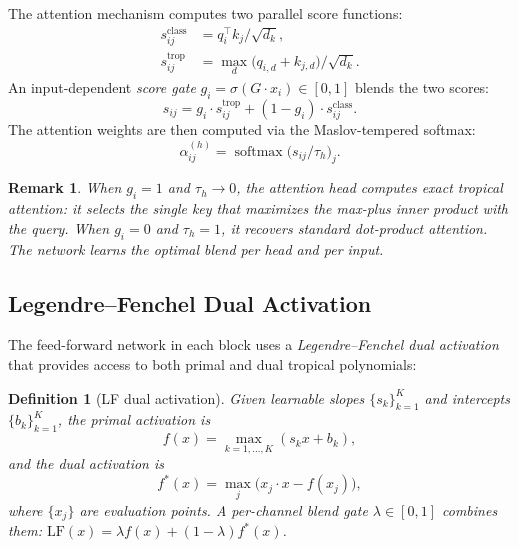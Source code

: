 \documentclass[11pt,twocolumn]{article}
\newtheorem{definition}[theorem]{Definition}
\newtheorem{remark}[theorem]{Remark}
\newcommand{\softmax}{\operatorname{softmax}}
\begin{document}
The attention mechanism computes two parallel score functions:
\begin{align}
  s^\text{class}_{ij} &= q_i^\top k_j / \sqrt{d_k}, \label{eq:class-score} \\
  s^\text{trop}_{ij} &= \max_d\bigl(q_{i,d} + k_{j,d}\bigr) / \sqrt{d_k}. \label{eq:trop-score}
\end{align}
An input-dependent \emph{score gate} $g_i = \sigma(G \cdot x_i) \in [0,1]$
blends the two scores:
\begin{equation}\label{eq:score-blend}
  s_{ij} = g_i \cdot s^\text{trop}_{ij} + (1 - g_i) \cdot s^\text{class}_{ij}.
\end{equation}
The attention weights are then computed via the Maslov-tempered softmax:
\begin{equation}\label{eq:maslov-softmax}
  \alpha_{ij}^{(h)} = \softmax\bigl(s_{ij} / \tau_h\bigr)_j.
\end{equation}

\begin{remark}
When $g_i = 1$ and $\tau_h \to 0$, the attention head computes exact tropical
attention: it selects the single key that maximizes the max-plus inner product
with the query. When $g_i = 0$ and $\tau_h = 1$, it recovers standard
dot-product attention. The network learns the optimal blend per head and per
input.
\end{remark}

\subsection{Legendre--Fenchel Dual Activation}\label{sec:lf-act}

The feed-forward network in each block uses a \emph{Legendre--Fenchel dual
activation} that provides access to both primal and dual tropical polynomials:

\begin{definition}[LF dual activation]
Given learnable slopes $\{s_k\}_{k=1}^K$ and intercepts $\{b_k\}_{k=1}^K$,
the primal activation is
\begin{equation}\label{eq:lf-primal}
  f(x) = \max_{k=1,\ldots,K}(s_k x + b_k),
\end{equation}
and the dual activation is
\begin{equation}\label{eq:lf-dual}
  f^*(x) = \max_{j}\bigl(x_j \cdot x - f(x_j)\bigr),
\end{equation}
where $\{x_j\}$ are evaluation points. A per-channel blend gate
$\lambda \in [0,1]$ combines them:
$\text{LF}(x) = \lambda f(x) + (1-\lambda) f^*(x)$.
\end{definition}
\end{document}
